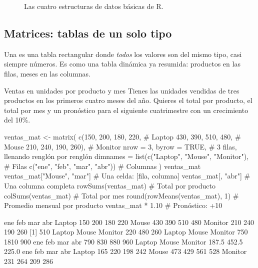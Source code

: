 \begin{figure}[H]
\caption{Las cuatro estructuras de datos básicas de R.}
\label{fig:m01-estructuras}
\end{figure}

\subsection{Matrices: tablas de un solo tipo}

Una  es una tabla rectangular donde \emph{todos} los
valores son del mismo tipo, casi siempre números. Es como una tabla
dinámica ya resumida: productos en las filas, meses en las columnas.

\begin{ejemplo}{Ventas en unidades por producto y mes}
Tienes las unidades vendidas de tres productos en los primeros cuatro meses
del año. Quieres el total por producto, el total por mes y un pronóstico
para el siguiente cuatrimestre con un crecimiento del 10\%.
\end{ejemplo}

\begin{rcode}
ventas_mat <- matrix(
  c(150, 200, 180, 220,     # Laptop
    430, 390, 510, 480,     # Mouse
    210, 240, 190, 260),    # Monitor
  nrow = 3, byrow = TRUE,   # 3 filas, llenando renglón por renglón
  dimnames = list(c("Laptop", "Mouse", "Monitor"),     # Filas
                  c("ene", "feb", "mar", "abr"))       # Columnas
)
ventas_mat
ventas_mat["Mouse", "mar"]      # Una celda: [fila, columna]
ventas_mat[, "abr"]             # Una columna completa
rowSums(ventas_mat)             # Total por producto
colSums(ventas_mat)             # Total por mes
round(rowMeans(ventas_mat), 1)  # Promedio mensual por producto
ventas_mat * 1.10               # Pronóstico: +10%
\end{rcode}
\begin{rsalida}
        ene feb mar abr
Laptop  150 200 180 220
Mouse   430 390 510 480
Monitor 210 240 190 260
[1] 510
 Laptop   Mouse Monitor 
    220     480     260 
 Laptop   Mouse Monitor 
    750    1810     900 
ene feb mar abr 
790 830 880 960 
 Laptop   Mouse Monitor 
  187.5   452.5   225.0 
        ene feb mar abr
Laptop  165 220 198 242
Mouse   473 429 561 528
Monitor 231 264 209 286
\end{rsalida}

